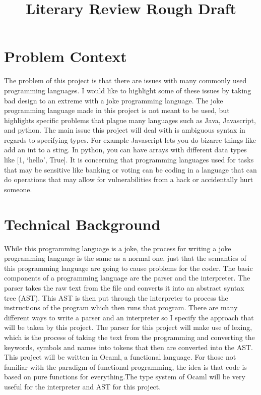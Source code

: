 \documentclass[10pt,twocolumn]{article}
\title{Literary Review Rough Draft}
\begin{document}
\maketitle

\section{Problem Context}

The problem of this project is that there are issues with many commonly used programming languages. I would like to highlight some of these issues by taking bad design to an extreme with a joke programming language. The joke programming language made in this project is not meant to be used, but highlights specific problems that plague many languages such as Java, Javascript, and python. The main issue this project will deal with is ambiguous syntax in regards to specifying types. For example Javascript lets you do bizarre things like add an int to a sting. In python, you can have arrays with different data types like [1, ‘hello’, True]. It is concerning that programming languages used for tasks that may be sensitive like banking or voting can be coding in a language that can do operations that may allow for vulnerabilities from a hack or accidentally hurt someone.

\section{Technical Background}

While this programming language is a joke, the process for writing a joke programming language is the same as a normal one, just that the semantics of this programming language are going to cause problems for the coder. The basic components of a programming language are the parser and the interpreter. The parser takes the raw text from the file and converts it into an abstract syntax tree (AST). This AST is then put through the interpreter to process the instructions of the program which then runs that program.
There are many different ways to write a parser and an interpreter so I specify the approach that will be taken by this project. The parser for this project will make use of lexing, which is the process of taking the text from the programming and converting the keywords, symbols and names into tokens that then are converted into the AST.
This project will be written in Ocaml, a functional language. For those not familiar with the paradigm of functional programming, the idea is that code is based on pure functions for everything.The type system of Ocaml will be very useful for the interpreter and AST for this project.
\end{document}
